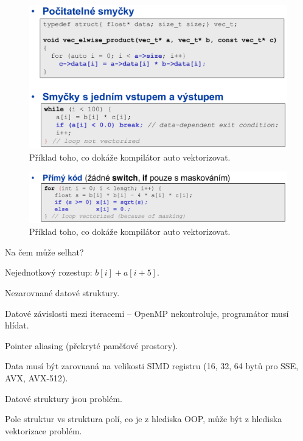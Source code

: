 \begin{compactitem}
\begin{compactitem}
        \begin{figure}[H]
            \centering
            \includegraphics[width=0.85\linewidth]{auto_vektorizace_1.pdf}
            \caption{Příklad toho, co dokáže kompilátor auto vektorizovat.}
        \end{figure}

        \begin{figure}[H]
            \centering
            \includegraphics[width=0.85\linewidth]{auto_vektorizace_2.pdf}
            \caption{Příklad toho, co dokáže kompilátor auto vektorizovat.}
        \end{figure}
    \end{compactitem}

    \item Na čem může selhat? \begin{compactitem}
        \item Nejednotkový rozestup: $b[i] + a[i+5]$.
        \item Nezarovnané datové struktury.
        \item Datové závislosti mezi iteracemi -- OpenMP nekontroluje, programátor musí hlídat.
        \item Pointer aliasing (překryté paměťové prostory).
        \item Data musí být zarovnaná na velikosti SIMD registru (16, 32, 64 bytů pro SSE, AVX, AVX-512).
    \end{compactitem}

    \item Datové struktury jsou problém. \begin{compactitem}
        \item Pole struktur vs struktura polí, co je  z hlediska OOP, může být z hlediska vektorizace problém.
    \end{compactitem}


\end{compactitem}
